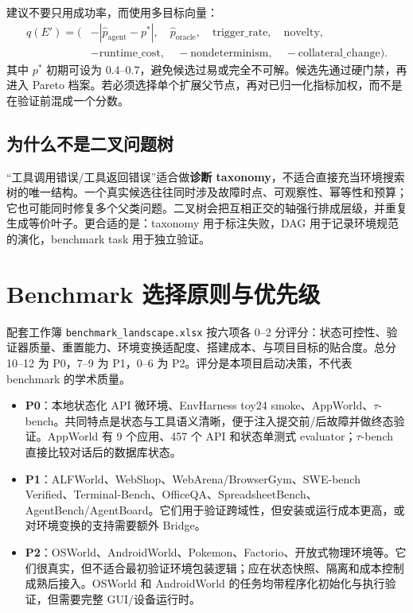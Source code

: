 \documentclass[11pt,a4paper,fontset=fandol]{ctexart}
\newcommand{\code}[1]{\texttt{#1}}
\newcommand{\pzero}{\textbf{P0}}
\newcommand{\pone}{\textbf{P1}}
\newcommand{\ptwo}{\textbf{P2}}
\begin{document}
建议不要只用成功率，而使用多目标向量：
\begin{align}
q(E') = (&- |\hat p_{\mathrm{agent}}-p^*|,\quad
\hat p_{\mathrm{oracle}},\quad
\mathrm{trigger\_rate},\quad
\mathrm{novelty},\\
&-\mathrm{runtime\_cost},\quad
-\mathrm{nondeterminism},\quad
-\mathrm{collateral\_change}).
\end{align}
其中 $p^*$ 初期可设为 0.4--0.7，避免候选过易或完全不可解。候选先通过硬门禁，再进入 Pareto 档案。若必须选择单个扩展父节点，再对已归一化指标加权，而不是在验证前混成一个分数。

\subsection{为什么不是二叉问题树}

“工具调用错误/工具返回错误”适合做\textbf{诊断 taxonomy}，不适合直接充当环境搜索树的唯一结构。一个真实候选往往同时涉及故障时点、可观察性、幂等性和预算；它也可能同时修复多个父类问题。二叉树会把互相正交的轴强行排成层级，并重复生成等价叶子。更合适的是：taxonomy 用于标注失败，DAG 用于记录环境规范的演化，benchmark task 用于独立验证。

\section{Benchmark 选择原则与优先级}

配套工作簿 \code{benchmark\_landscape.xlsx} 按六项各 0--2 分评分：状态可控性、验证器质量、重置能力、环境变换适配度、搭建成本、与项目目标的贴合度。总分 10--12 为 P0，7--9 为 P1，0--6 为 P2。评分是本项目启动决策，不代表 benchmark 的学术质量。

\begin{itemize}
  \item \pzero：本地状态化 API 微环境、EnvHarness toy24 smoke、AppWorld、$\tau$-bench。共同特点是状态与工具语义清晰，便于注入提交前/后故障并做终态验证。AppWorld 有 9 个应用、457 个 API 和状态单测式 evaluator\cite{appworld}；$\tau$-bench 直接比较对话后的数据库状态\cite{taubench}。
  \item \pone：ALFWorld、WebShop、WebArena/BrowserGym、SWE-bench Verified、Terminal-Bench、OfficeQA、SpreadsheetBench、AgentBench/AgentBoard。它们用于验证跨域性，但安装或运行成本更高，或对环境变换的支持需要额外 Bridge。
  \item \ptwo：OSWorld、AndroidWorld、Pokemon、Factorio、开放式物理环境等。它们很真实，但不适合最初验证环境包装逻辑；应在状态快照、隔离和成本控制成熟后接入。OSWorld 和 AndroidWorld 的任务均带程序化初始化与执行验证，但需要完整 GUI/设备运行时\cite{osworld,androidworld}。
\end{itemize}
\end{document}

